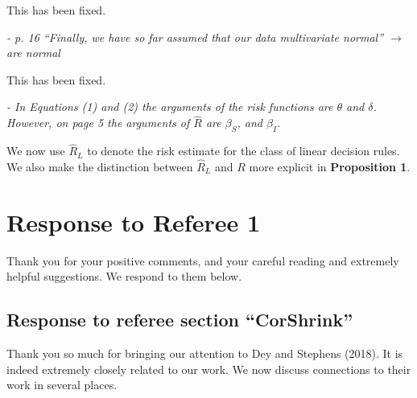 \documentclass[12pt]{article}
\begin{document}
\begin{enumerate}
This has been fixed.

\emph{- p. 16 “Finally, we have so far assumed that our data multivariate normal” $\to$ are normal}

This has been fixed.

\emph{- In Equations (1) and (2) the arguments of the risk functions are $\theta$ and $\delta$. However, on page 5 the arguments of $\hat{R}$ are $\beta_{S}$, and $\beta_{I}$.}

We now use $\hat{R}_L$ to denote the risk estimate for the class of linear decision rules. We also make the distinction between $\hat{R}_L$ and $R$ more explicit in \textbf{Proposition 1}.
\end{enumerate}

\section{Response to Referee 1}

Thank you for your positive comments, and your careful reading and extremely helpful suggestions. We respond to them below.

\subsection{Response to referee section ``CorShrink''}

Thank you so much for bringing our attention to Dey and Stephens (2018). It is indeed extremely closely related to our work. We now discuss connections to their work in several places.
\end{document}
